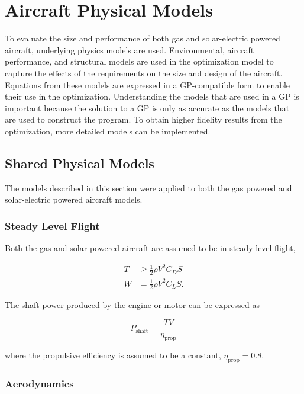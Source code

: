 \section{Aircraft Physical Models}

To evaluate the size and performance of both gas and solar-electric powered aircraft, underlying physics models are used.  
Environmental, aircraft performance, and structural models are used in the optimization model to capture the effects of the requirements on the size and design of the aircraft.
Equations from these models are expressed in a GP-compatible form to enable their use in the optimization. 
Understanding the models that are used in a GP is important because the solution to a GP is only as accurate as the models that are used to construct the program.  
To obtain higher fidelity results from the optimization, more detailed models can be implemented. 

\subsection{Shared Physical Models}

The models described in this section were applied to both the gas powered and solar-electric powered aircraft models. 

\subsubsection{Steady Level Flight}

Both the gas and solar powered aircraft are assumed to be in steady level flight,\cite{hoburgthesis}

\begin{align}
    \label{e:slfthrust}
    T &\geq \frac{1}{2} \rho V^2 C_D S\\
    \label{e:slfweight}
    W &= \frac{1}{2} \rho V^2 C_L S. 
\end{align}

The shaft power produced by the engine or motor can be expressed as  

\begin{equation}
    \label{e:slfpower}
    P_{\text{shaft}} = \frac{TV}{\eta_{\text{prop}}}
    \end{equation}

    where the propulsive efficiency is assumed to be a constant, $\eta_{\text{prop}} = 0.8$. 

\subsubsection{Aerodynamics}

